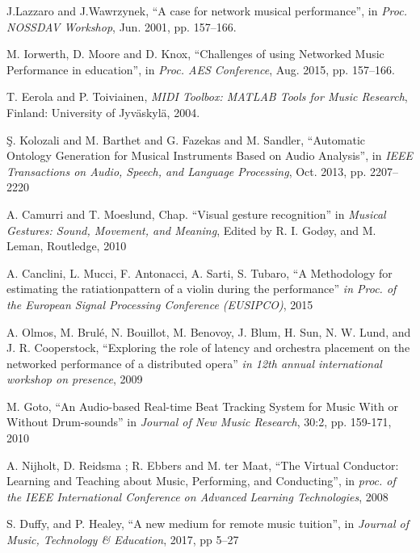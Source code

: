 
J.Lazzaro and J.Wawrzynek, ``A case for network musical performance'', in \emph{Proc. NOSSDAV Workshop}, Jun. 2001, pp. 157--166. 


M. Iorwerth, D. Moore and D. Knox, ``Challenges of using Networked Music Performance in education'', in  \emph{Proc. AES Conference}, Aug. 2015, pp. 157--166. 


T. Eerola and P. Toiviainen, \emph{MIDI Toolbox: MATLAB Tools for Music Research}, Finland: University of Jyv{\"a}skyl{\"a},  2004.

\c{S}. Kolozali and M. Barthet and G. Fazekas and M. Sandler, ``Automatic Ontology Generation for Musical Instruments Based on Audio Analysis'', in \emph{IEEE Transactions on Audio, Speech, and Language Processing}, Oct. 2013, pp. {2207--2220}

A. Camurri and T. Moeslund, Chap. ``Visual gesture recognition'' in \emph{Musical Gestures: Sound, Movement, and Meaning}, Edited by R. I. God{\o}y, and M. Leman, Routledge, 2010

A. Canclini, L. Mucci, F. Antonacci, A. Sarti, S. Tubaro, ``A Methodology for estimating the ratiationpattern of a violin during the performance'' \emph{in Proc. of the European Signal Processing Conference (EUSIPCO)}, 2015

A. Olmos, M. Brulé, N. Bouillot, M. Benovoy, J. Blum, H. Sun, N. W. Lund, and J. R. Cooperstock, ``Exploring the role of latency and orchestra placement on the networked performance of a distributed opera'' \emph{in 12th annual international workshop on presence}, 2009

M. Goto, ``An Audio-based Real-time Beat Tracking System for Music With or Without Drum-sounds'' in \emph{Journal of New Music Research}, 30:2, pp. 159-171, 2010


A. Nijholt, D. Reidsma ; R. Ebbers and M. ter Maat, ``The Virtual Conductor: Learning and Teaching about Music, Performing, and Conducting'', in \emph{proc. of the IEEE International Conference on Advanced Learning Technologies}, 2008

S. Duffy, and P. Healey, ``A new medium for remote music tuition'', in \emph{Journal of Music, Technology \& Education}, 2017, pp 5--27

